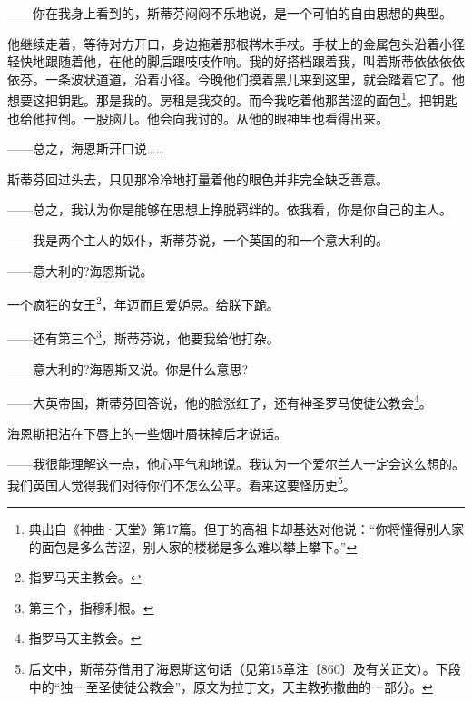 \par ——你在我身上看到的，斯蒂芬闷闷不乐地说，是一个可怕的自由思想的典型。
\par 他继续走着，等待对方开口，身边拖着那根梣木手杖。手杖上的金属包头沿着小径轻快地跟随着他，在他的脚后跟吱吱作响。我的好搭档跟着我，叫着斯蒂依依依依依芬。一条波状道道，沿着小径。今晚他们摸着黑儿来到这里，就会踏着它了。他想要这把钥匙。那是我的。房租是我交的。而今我吃着他那苦涩的面包\footnote{典出自《神曲·天堂》第17篇。但丁的高祖卡却基达对他说：“你将懂得别人家的面包是多么苦涩，别人家的楼梯是多么难以攀上攀下。”}。把钥匙也给他拉倒。一股脑儿。他会向我讨的。从他的眼神里也看得出来。
\par ——总之，海恩斯开口说……
\par 斯蒂芬回过头去，只见那冷冷地打量着他的眼色并非完全缺乏善意。
\par ——总之，我认为你是能够在思想上挣脱羁绊的。依我看，你是你自己的主人。
\par ——我是两个主人的奴仆，斯蒂芬说，一个英国的和一个意大利的。
\par ——意大利的?海恩斯说。
\par 一个疯狂的女王\footnote{指罗马天主教会。}，年迈而且爱妒忌。给朕下跪。
\par ——还有第三个\footnote{第三个，指穆利根。}，斯蒂芬说，他要我给他打杂。
\par ——意大利的?海恩斯又说。你是什么意思?
\par ——大英帝国，斯蒂芬回答说，他的脸涨红了，还有神圣罗马使徒公教会\footnote{指罗马天主教会。}。
\par 海恩斯把沾在下唇上的一些烟叶屑抹掉后才说话。
\par ——我很能理解这一点，他心平气和地说。我认为一个爱尔兰人一定会这么想的。我们英国人觉得我们对待你们不怎么公平。看来这要怪历史\footnote{后文中，斯蒂芬借用了海恩斯这句话（见第15章注〔860〕及有关正文）。下段中的“独一至圣使徒公教会”，原文为拉丁文，天主教弥撒曲的一部分。}。
